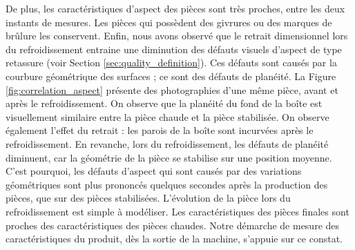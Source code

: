De plus, les caractéristiques d'aspect des pièces sont très proches, entre les deux instants de mesures.
Les pièces qui possèdent des givrures ou des marques de brûlure les conservent.
Enfin, nous avons observé que le retrait dimensionnel lors du refroidissement entraine une diminution des défauts visuels d'aspect de type retassure (voir Section \ref{sec:quality_definition}).
Ces défauts sont causés par la courbure géométrique des surfaces ; ce sont des défauts de planéité.
La Figure \ref{fig:correlation_aspect} présente des photographies d'une même pièce, avant et après le refroidissement.
On observe que la planéité du fond de la boîte est visuellement similaire entre la pièce chaude et la pièce stabilisée.
On observe également l'effet du retrait : les parois de la boîte sont incurvées après le refroidissement.
En revanche, lors du refroidissement, les défauts de planéité diminuent, car la géométrie de la pièce se stabilise sur une position moyenne.
C'est pourquoi, les défauts d'aspect qui sont causés par des variations géométriques sont plus prononcés quelques secondes après la production des pièces, que sur des pièces stabilisées.
L'évolution de la pièce lors du refroidissement est simple à modéliser.
Les caractéristiques des pièces finales sont proches des caractéristiques des pièces chaudes.
Notre démarche de mesure des caractéristiques du produit, dès la sortie de la machine, s'appuie sur ce constat.

\bigskip

\bigskip

